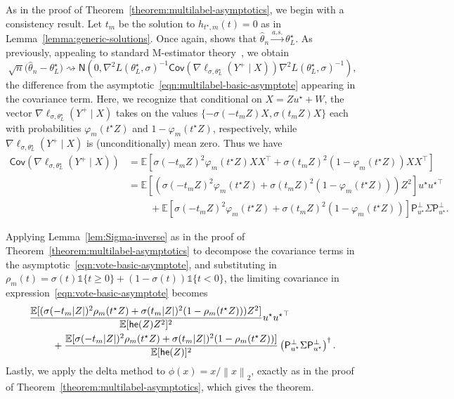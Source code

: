 \documentclass[11pt]{article}
\newcommand{\ind}{\mathds{1}}
\newcommand{\cov}{\mathsf{Cov}}
\newcommand{\E}{\mathbb{E}}
\newcommand{\prn}[1]{\left({#1}\right)} %
\newcommand{\norm}[1]{\left\|{#1}\right\|} %
\newcommand{\what}[1]{\widehat{#1}}
\newcommand{\majY}{Y^+}
\newcommand{\normal}{\mathsf{N}}
\newcommand{\proj}{\mathsf{P}}
\newcommand{\projperp}{\proj_{u\opt}^\perp}
\newcommand{\loss}{\ell}
\newcommand{\ltwo}[1]{\norm{#1}_2} %
\newcommand{\<}{\langle} %
\renewcommand{\>}{\rangle}
\newcommand{\cd}{\rightsquigarrow}
\newcommand{\cas}{\stackrel{a.s.}{\rightarrow}}
\newcommand{\opt}{^\star}
\begin{document}
As in the proof of Theorem~\ref{theorem:multilabel-asymptotics}, we begin
with a consistency result. Let $t_m$ be the solution to $h_{t\opt, m}(t) =
0$ as in Lemma~\ref{lemma:generic-solutions}.
Once again, \citet[Thm.~5.4]{ShapiroDeRu09}
shows that $\what{\theta}_n \cas \theta\opt_L$.
As previously, appealing to standard
M-estimator theory~\cite[e.g.][Thm.~5.23]{VanDerVaart98},
we obtain
\begin{equation}
	\label{eqn:vote-basic-asymptote}
	\sqrt{n} \big(\what{\theta}_n - \theta\opt_L\big)
	\cd \normal\left(0, \nabla^2 L(\theta\opt_L, \sigma)^{-1}
	\cov \left(\nabla \loss_{\sigma,\theta\opt_L}(\majY \mid X)\right)
	\nabla^2 L(\theta\opt_L, \sigma)^{-1} \right),
\end{equation}
the difference from the asymptotic~\eqref{eqn:multilabel-basic-asymptote}
appearing in the covariance term.
Here, we recognize that conditional on $X = Z u\opt + W$, the vector
$\nabla \loss_{\sigma,\theta\opt_L}(\majY \mid X)$
takes on the values
$\{-\sigma(-t_m Z) X, \sigma(t_m Z) X\}$ each with probabilities
$\varphi_m(t\opt Z)$ and $1 - \varphi_m(t\opt Z)$, respectively,
while $\nabla \loss_{\sigma,\theta\opt_L}(\majY \mid X)$ is (unconditionally)
mean zero.
Thus
we have
\begin{align*}
	\cov \left(\nabla \loss_{\sigma,\theta\opt_L}(\majY \mid X)\right)
	& = \E\left[\sigma(-t_m Z)^2 \varphi_m(t\opt Z) XX^\top
	+ \sigma(t_m Z)^2 (1 - \varphi_m(t\opt Z)) XX^\top\right] \\
	& = \E\left[\left(\sigma(- t_m Z)^2 \varphi_m(t\opt Z)
	+ \sigma(t_m Z)^2 (1 - \varphi_m(t\opt Z))\right) Z^2\right]
	u\opt{u\opt}^\top \\
	& \qquad ~ +
	\E\left[\sigma(- t_m Z)^2 \varphi_m(t\opt Z)
	+ \sigma(t_m Z)^2 (1 - \varphi_m(t\opt Z))\right]
	\projperp \Sigma \projperp.
\end{align*}

Applying Lemma~\ref{lem:Sigma-inverse}
as in the proof of Theorem~\ref{theorem:multilabel-asymptotics}
to  decompose the covariance
terms in the asymptotic~\eqref{eqn:vote-basic-asymptote}, and substituting in $\rho_m(t) = \sigma(t) \ind \{t \geq 0\} + (1- \sigma(t)) \ind \{t < 0\}$,
the limiting covariance in expression~\eqref{eqn:vote-basic-asymptote}
becomes
\begin{align*}
  & \frac{\E[(\sigma(-t_m |Z|)^2 \rho_m(t\opt Z) + \sigma(t_m |Z|)^2
      (1 - \rho_m(t\opt Z))) Z^2]}{
    \E[\hessfunc(Z) Z^2]^2}
  u\opt {u\opt}^\top \\
  & \qquad ~ + 
  \frac{\E[\sigma(-t_m |Z|)^2 \rho_m(t\opt Z) + \sigma(t_m |Z|)^2
      (1 - \rho_m(t\opt Z))]}{
    \E[\hessfunc(Z)]^2}
  \prn{\projperp \Sigma \projperp}^\dagger.
\end{align*}
Lastly, we apply the delta method to $\phi(x) = x / \ltwo{x}$,
exactly as in the proof of Theorem~\ref{theorem:multilabel-asymptotics},
which gives the theorem.
\end{document}
